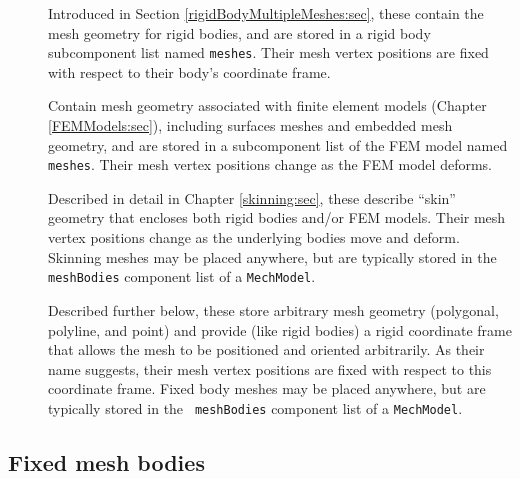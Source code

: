 \begin{description}

\item[]\mbox{}

Introduced in Section \ref{rigidBodyMultipleMeshes:sec}, these contain
the mesh geometry for rigid bodies, and are stored in a rigid body
subcomponent list named {\tt meshes}. Their mesh vertex positions
are fixed with respect to their body's coordinate frame.

\item[]\mbox{}

Contain mesh geometry associated with finite element models (Chapter
\ref{FEMModels:sec}), including surfaces meshes and embedded mesh
geometry, and are stored in a subcomponent list of the FEM model
named {\tt meshes}. Their mesh vertex positions change as the FEM model
deforms.

\item[]\mbox{}

Described in detail in Chapter \ref{skinning:sec}, these describe
``skin'' geometry that encloses both rigid bodies and/or FEM models.
Their mesh vertex positions change as the underlying bodies move and
deform. Skinning meshes may be placed anywhere, but are typically
stored in the {\tt meshBodies} component list of a {\tt MechModel}.

\item[]\mbox{}

Described further below, these store arbitrary mesh geometry
(polygonal, polyline, and point) and provide (like rigid bodies) a
rigid coordinate frame that allows the mesh to be positioned and
oriented arbitrarily. As their name suggests, their mesh vertex
positions are fixed with respect to this coordinate frame. Fixed body
meshes may be placed anywhere, but are typically stored in the {\tt
meshBodies} component list of a {\tt MechModel}.

\end{description}

\subsection{Fixed mesh bodies}
\label{FixedMeshBodies:sec}

